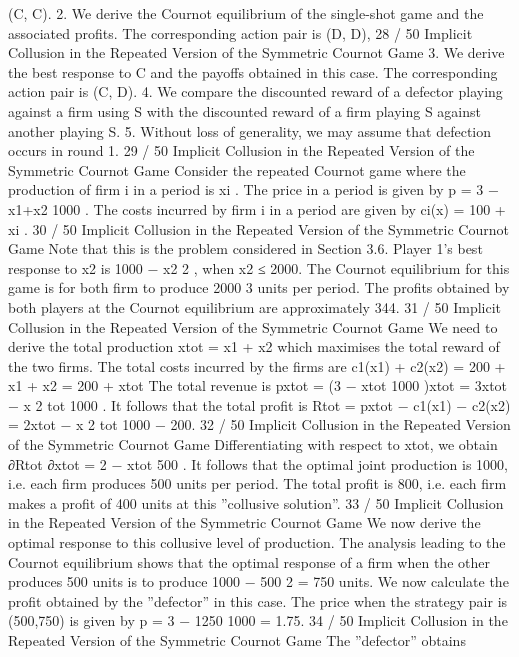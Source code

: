 (C, C).
2. We derive the Cournot equilibrium of the single-shot
game and the associated profits. The corresponding
action pair is (D, D),
28 / 50
Implicit Collusion in the Repeated Version of the
Symmetric Cournot Game
3. We derive the best response to C and the payoffs
obtained in this case. The corresponding action pair
is (C, D).
4. We compare the discounted reward of a defector
playing against a firm using S with the discounted
reward of a firm playing S against another playing S.
5. Without loss of generality, we may assume that
defection occurs in round 1.
29 / 50
Implicit Collusion in the Repeated Version of the
Symmetric Cournot Game
Consider the repeated Cournot game where the production of firm
i in a period is xi
.
The price in a period is given by p = 3 −
x1+x2
1000 .
The costs incurred by firm i in a period are given by
ci(x) = 100 + xi
.
30 / 50
Implicit Collusion in the Repeated Version of the
Symmetric Cournot Game
Note that this is the problem considered in Section 3.6.
Player 1’s best response to x2 is 1000 −
x2
2
, when x2 ≤ 2000.
The Cournot equilibrium for this game is for both firm to produce
2000
3
units per period.
The profits obtained by both players at the Cournot equilibrium are
approximately 344.
31 / 50
Implicit Collusion in the Repeated Version of the
Symmetric Cournot Game
We need to derive the total production xtot = x1 + x2 which
maximises the total reward of the two firms.
The total costs incurred by the firms are
c1(x1) + c2(x2) = 200 + x1 + x2 = 200 + xtot
The total revenue is pxtot = (3 −
xtot
1000 )xtot = 3xtot −
x
2
tot
1000 .
It follows that the total profit is
Rtot = pxtot − c1(x1) − c2(x2) = 2xtot −
x
2
tot
1000 − 200.
32 / 50
Implicit Collusion in the Repeated Version of the
Symmetric Cournot Game
Differentiating with respect to xtot, we obtain
∂Rtot
∂xtot
= 2 −
xtot
500
.
It follows that the optimal joint production is 1000, i.e. each firm
produces 500 units per period.
The total profit is 800, i.e. each firm makes a profit of 400 units at
this ”collusive solution”.
33 / 50
Implicit Collusion in the Repeated Version of the
Symmetric Cournot Game
We now derive the optimal response to this collusive level of
production.
The analysis leading to the Cournot equilibrium shows that the
optimal response of a firm when the other produces 500 units is to
produce 1000 −
500
2 = 750 units.
We now calculate the profit obtained by the ”defector” in this case.
The price when the strategy pair is (500,750) is given by
p = 3 −
1250
1000 = 1.75.
34 / 50
Implicit Collusion in the Repeated Version of the
Symmetric Cournot Game
The ”defector” obtains
